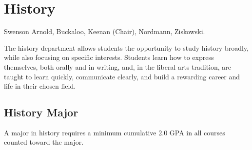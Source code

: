 \documentclass[
  letterpaper,
]{scrbook}
\begin{document}
\section{History}\label{sec-history}

Swenson Arnold, Buckaloo, Keenan (Chair), Nordmann, Ziskowski.

The history department allows students the opportunity to study history
broadly, while also focusing on specific interests. Students learn how
to express themselves, both orally and in writing, and, in the liberal
arts tradition, are taught to learn quickly, communicate clearly, and
build a rewarding career and life in their chosen field.

\subsection{History Major}\label{history-major}

A major in history requires a minimum cumulative 2.0 GPA in all courses
counted toward the major.
\end{document}
